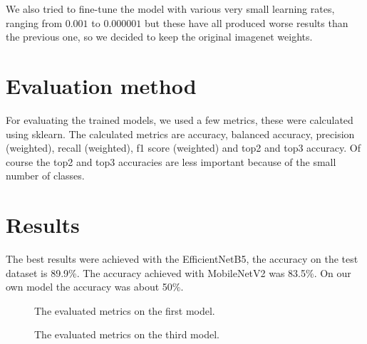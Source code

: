 \documentclass[twocolumn]{article}
\begin{document}
	We also tried to fine-tune the model with various very small learning rates, ranging from $0.001$ to $0.000001$ but these have all produced worse results than the previous one, so we decided to keep the original imagenet weights.
	
	\section{Evaluation method}
	For evaluating the trained models, we used a few metrics, these were calculated using sklearn. The calculated metrics are accuracy, balanced accuracy, precision (weighted), recall (weighted), f1 score (weighted) and top2 and top3 accuracy. Of course the top2 and top3 accuracies are less important because of the small number of classes.
	
	\section{Results}
	The best results were achieved with the EfficientNetB5, the accuracy on the test dataset is 89.9\%. The accuracy achieved with MobileNetV2 was 83.5\%. On our own model the accuracy was about 50\%.
	
	\begin{figure}
		\centering
		\caption{The evaluated metrics on the first model.}
		\label{model1_metrics}
	\end{figure}
	\begin{figure}
		\centering
		\caption{The evaluated metrics on the third model.}
		\label{model3_metrics}
	\end{figure}
	
\end{document}
